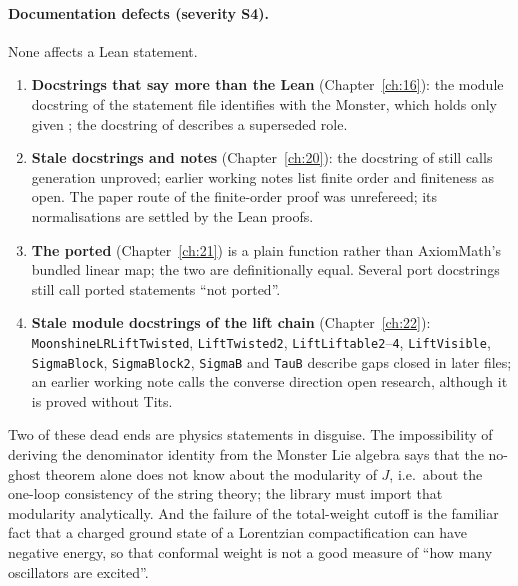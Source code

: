 \paragraph{Documentation defects (severity S4).} None affects a Lean statement.
\begin{enumerate}
\item \textbf{Docstrings that say more than the Lean} (Chapter~\ref{ch:16}): the module docstring of the statement file
  identifies  with the Monster, which holds only given ; the docstring of
   describes a superseded role.
\item \textbf{Stale docstrings and notes} (Chapter~\ref{ch:20}): the docstring of 
  still calls generation unproved; earlier working notes list finite
  order and finiteness as open. The paper route of the finite-order proof was unrefereed; its normalisations are settled
  by the Lean proofs.
\item \textbf{The ported } (Chapter~\ref{ch:21}) is a plain function rather than AxiomMath's bundled linear map;
  the two are definitionally equal. Several port docstrings still call ported statements ``not ported''.
\item \textbf{Stale module docstrings of the lift chain} (Chapter~\ref{ch:22}): \texttt{MoonshineLRLiftTwisted},
  \texttt{LiftTwisted2}, \texttt{LiftLiftable2}--\texttt{4}, \texttt{LiftVisible}, \texttt{SigmaBlock},
  \texttt{SigmaBlock2}, \texttt{SigmaB} and \texttt{TauB} describe gaps closed in later files; an earlier working note
  calls the converse direction open research, although it is proved without Tits.
\end{enumerate}

\begin{physics}
Two of these dead ends are physics statements in disguise. The impossibility of deriving the denominator identity from the
Monster Lie algebra says that the no-ghost theorem alone does not know about the modularity of $J$, i.e.\ about the
one-loop consistency of the string theory; the library must import that modularity analytically. And the failure of the
total-weight cutoff is the familiar fact that a charged ground state of a Lorentzian compactification can have negative
energy, so that conformal weight is not a good measure of ``how many oscillators are excited''.
\end{physics}

